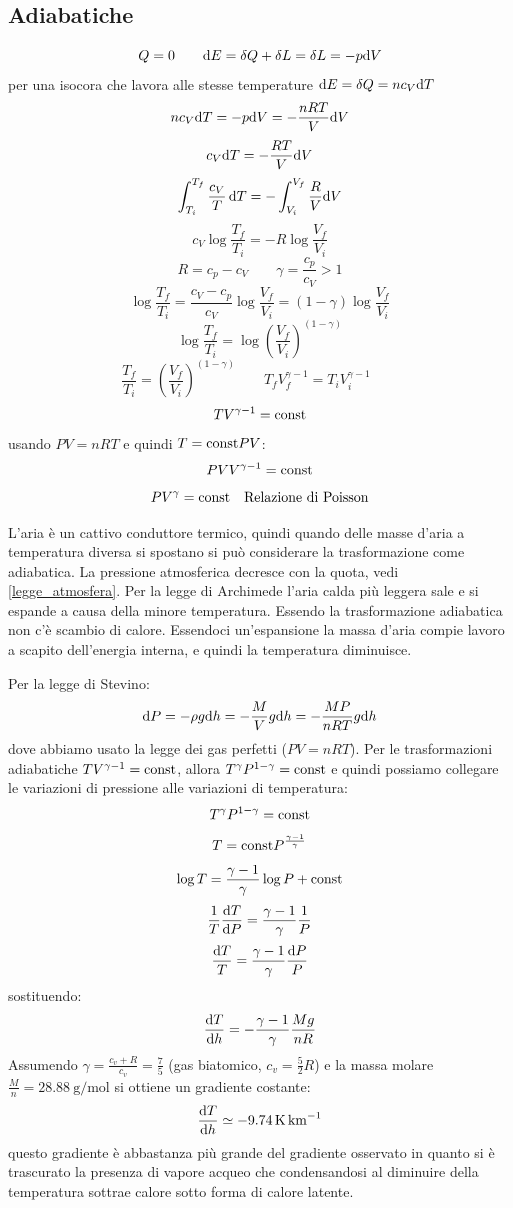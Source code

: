 \subsection{Adiabatiche}
\[Q=0\qquad \mathrm{d} E=\delta Q+\delta L=\delta L=-p\mathrm{d} V\]
per una isocora che lavora alle stesse temperature $\mathrm{d} E=\delta Q=nc_V\mathrm{d} T$
\[nc_V\mathrm{d} T=-p\mathrm{d} V=-\frac{nRT}{V}\mathrm{d} V\]
\[c_V\mathrm{d} T=-\frac{RT}{V}\mathrm{d} V\]
\[\int_{T_i}^{T_f}\frac{c_V}{T}\,\mathrm{d} T=-\int_{V_i}^{V_f}\frac{R}{V}\mathrm{d} V\]
\[c_V\log\frac{T_f}{T_i}=-R\log\frac{V_f}{V_i}\]
\[R=c_p-c_V\qquad \gamma=\frac{c_p}{c_V}>1\]
\[\log\frac{T_f}{T_i}=\frac{c_V-c_p}{c_V}\log\frac{V_f}{V_i}=(1-\gamma)\log\frac{V_f}{V_i}\]
\[\log\frac{T_f}{T_i}=\log\left(\frac{V_f}{V_i}\right)^{\left(1-\gamma\right)}\]
\[\frac{T_f}{T_i}=\left(\frac{V_f}{V_i}\right)^{\left(1-\gamma\right)}\qquad T_fV_f^{\gamma-1}=T_iV_i^{\gamma-1}\qquad\]
\[TV^{\gamma-1}=\text{const}\]
usando $PV=nRT$ e quindi $T=\text{const} PV$:
\[PVV^{\gamma-1}=\text{const}\]
\begin{equation}
   PV^\gamma=\text{const}\quad\text{Relazione di Poisson}
\end{equation}

\begin{Es}
   L'aria è un cattivo conduttore termico, quindi quando delle masse d'aria a temperatura diversa si spostano si può considerare la trasformazione come adiabatica. La pressione atmosferica decresce con la quota, vedi \eqref{legge_atmosfera}. Per la legge di Archimede l'aria calda più leggera sale e si espande a causa della minore temperatura. Essendo la trasformazione adiabatica non c'è scambio di calore. Essendoci un'espansione la massa d'aria compie lavoro a scapito dell'energia interna, e quindi la temperatura diminuisce.

   Per la legge di Stevino:
   \[
      \mathrm{d} P = -\rho g \mathrm{d} h = -\frac{M}{V} g \mathrm{d} h = -\frac{MP}{nRT} g \mathrm{d} h
   \]
   dove abbiamo usato la legge dei gas perfetti ($PV=nRT$). Per le trasformazioni adiabatiche $TV^{\gamma-1}=\text{const}$, allora $T^\gamma P^{1-\gamma} = \text{const}$ e quindi possiamo collegare le variazioni di pressione alle variazioni di temperatura:
   \[ T^{\gamma} P^{1-\gamma} = \text{const}\]
   \[ T = \text{const} P^{\frac{\gamma - 1}{\gamma}}\]
   \[ \log T = \frac{\gamma - 1}{\gamma} \log P + \text{const}\]
   \[\frac{1}{T}\frac{\mathrm{d} T}{\mathrm{d} P} = \frac{\gamma - 1}{\gamma} \frac{1}{P} \]
   \[\frac{\mathrm{d} T}{T} = \frac{\gamma - 1}{\gamma} \frac{\mathrm{d} P}{P} \]
   sostituendo:
   \[
      \frac{\mathrm{d} T}{\mathrm{d} h} = -\frac{\gamma -1}{\gamma} \frac{Mg}{nR}
   \]
   Assumendo $\gamma = \frac{c_v+R}{c_v} = \frac{7}{5}$ (gas biatomico, $c_v = \frac{5}{2}R$) e la massa molare $\frac{M}{n} = \SI{28.88}{\gram\per\mol}$ si ottiene un gradiente costante:
   \[
      \frac{\mathrm{d} T}{\mathrm{d} h} \simeq -\SI{9.74}{\kelvin\per\kilo\meter}
   \]
   questo gradiente è abbastanza più grande del gradiente osservato in quanto si è trascurato la presenza di vapore acqueo che condensandosi al diminuire della temperatura sottrae calore sotto forma di calore latente.
\end{Es}


